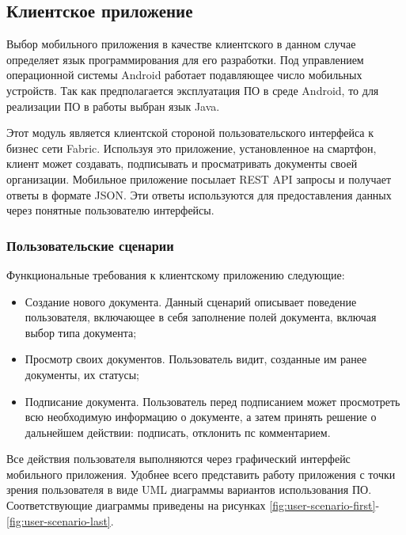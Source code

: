 
\subsection{Клиентское приложение}
 \label{subsec:ch2/sec3/subsec4}
 
Выбор мобильного приложения в качестве клиентского в данном случае определяет язык программирования для его разработки.
Под управлением операционной системы Android работает подавляющее число мобильных устройств. Так как предполагается эксплуатация ПО в среде Android, то для реализации ПО в работы выбран язык Java.
 
Этот модуль является  клиентской стороной пользовательского интерфейса к бизнес сети Fabric.  Используя это приложение,  установленное  на смартфон,  клиент  может создавать, подписывать и просматривать документы своей организации.  Мобильное приложение посылает REST API запросы и получает ответы в формате JSON. Эти ответы  используются  для  предоставления  данных  через  понятные  пользователю интерфейсы.

\subsubsection{Пользовательские сценарии}
 \label{subsec:ch2/sec3/subsec4/subsubsec1}
Функциональные требования к клиентскому приложению следующие:
\begin{itemize}
	\item Создание  нового  документа.  Данный  сценарий  описывает  поведение пользователя,  включающее  в  себя  заполнение  полей  документа,  включая  выбор типа документа;
	\item Просмотр  своих  документов.  Пользователь  видит,  созданные  им  ранее 
	документы, их статусы;
	\item Подписание документа. Пользователь перед подписанием может просмотреть 
	всю  необходимую  информацию  о  документе,  а  затем  принять  решение  о 
	дальнейшем действии: подписать, отклонить пс комментарием.
\end{itemize}
Все действия пользователя выполняются через графический интерфейс мобильного приложения. Удобнее всего представить работу приложения с точки зрения пользователя в виде UML диаграммы вариантов использования ПО. Соответствующие диаграммы приведены на рисунках \ref{fig:user-scenario-first}-\ref{fig:user-scenario-last}.

